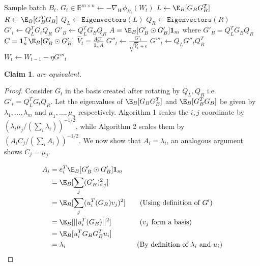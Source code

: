 \documentclass{article} %
\newtheorem{claim}{Claim}
\begin{document}
\begin{algorithm}[H]

\begin{algorithmic}[1]
    \STATE Sample batch $B_t$.
    \STATE $G_{t} \in \mathbb{R}^{m \times n} \gets -\nabla_W \phi_{B_t}(W_t)$
    \STATE $L \gets \E_{B}[G_{B}G_{B}^T]$
    \STATE $R \gets \E_{B}[G_{B}^TG_{B}]$
    \STATE $Q_L \gets \texttt{Eigenvectors}(L)$
    \STATE $Q_R \gets \texttt{Eigenvectors}(R)$
    \STATE $G'_{t} \gets Q_L^T G_{t} Q_R$
    \STATE {}
    \STATE $G'_{B} \gets Q_L^T G_{B} Q_R$ 
    \STATE $A = \E_{B}[G'_{B} \odot G'_{B}] \mathbf{1}_m$ where $G'_{B} = Q_L^T G_{B} Q_R$
    \STATE $C = \mathbf{1}_n^\top \E_{B}[G'_{B} \odot G'_{B}]$
    \STATE $\hat{V}_t = \frac{A C^T}{\mathbf{1}_n^\top A}$ 
    \STATE $G''_{t} \gets \frac{G'_t}{\sqrt{\hat{V}_t} + \epsilon}$ 
    \STATE $G'''_{t} \gets Q_L G''_{t} Q_R^T$ 
    \STATE $W_t \gets W_{t-1} - \eta G'''_{t}$
\end{algorithmic}
\caption{Single step of idealized Adafactor in Shampoo's eigenspace.}
\label{alg:shampoo_adafactor}
\end{algorithm}

\begin{claim}
\label{claim:eq}
 are equivalent. 
\end{claim}
\begin{proof}

Consider $G_t$ in the basis created after rotating by $Q_L, Q_R$ i.e. $G'_t = Q_L^T G_t Q_R$. Let the eigenvalues of $\E_{B}[G_{B}G_{B}^T]$ and $\E_{B}[G_{B}^TG_{B}]$  be given by $\lambda_1,...,\lambda_m$ and $\mu_1,...,\mu_n$ respectively. Algorithm 1 scales the $i, j$ coordinate by $(\lambda_i \mu_j / (\sum_i \lambda_i))^{-1/2}$, while Algorithm 2 scales them by  $(A_i C_j / (\sum_i A_i))^{-1/2}$. We  now show that $A_i = \lambda_i$, an analogous argument shows $C_j = \mu_j$.

\begin{align*}
    A_i &= e_i^T \E_{B}[G'_{B} \odot G'_{B}] \mathbf{1}_m \\
    &= \E_{B}[ \sum_j (G'_{B})_{i, j}^2] \\
    &= \E_{B}[ \sum_j (u_i^T(G_{B})v_j)^2] \quad \quad (\text{Using definition of } G') \\
    &= \E_{B}[  ||u_i^T(G_{B})||^2] \quad \quad \quad \quad (v_j \text{ form a basis})\\
    &= \E_{B}[ u_i^TG_{B}G_{B}^Tu_i] \\
    &= \lambda_i \quad \quad \quad \quad \quad \quad \quad \quad \quad \quad (\text{By definition of } \lambda_i \text{ and } u_i)
\end{align*}

\end{proof}
\end{document}
